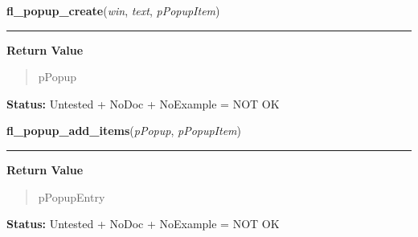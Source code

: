     \vspace{0.5ex}

\hspace{.8\funcindent}\begin{boxedminipage}{\funcwidth}

    \raggedright \textbf{fl\_popup\_create}(\textit{win}, \textit{text}, \textit{pPopupItem})

    \vspace{-1.5ex}

    \rule{\textwidth}{0.5\fboxrule}
\setlength{\parskip}{2ex}
\setlength{\parskip}{1ex}
      \textbf{Return Value}
    \vspace{-1ex}

      \begin{quote}
      pPopup

      \end{quote}

\textbf{Status:} Untested + NoDoc + NoExample = NOT OK



    \end{boxedminipage}

    \label{xformslib:library:fl_popup_add_items}

    \vspace{0.5ex}

\hspace{.8\funcindent}\begin{boxedminipage}{\funcwidth}

    \raggedright \textbf{fl\_popup\_add\_items}(\textit{pPopup}, \textit{pPopupItem})

    \vspace{-1.5ex}

    \rule{\textwidth}{0.5\fboxrule}
\setlength{\parskip}{2ex}
\setlength{\parskip}{1ex}
      \textbf{Return Value}
    \vspace{-1ex}

      \begin{quote}
      pPopupEntry

      \end{quote}

\textbf{Status:} Untested + NoDoc + NoExample = NOT OK



    \end{boxedminipage}

    \label{xformslib:library:fl_popup_insert_items}

